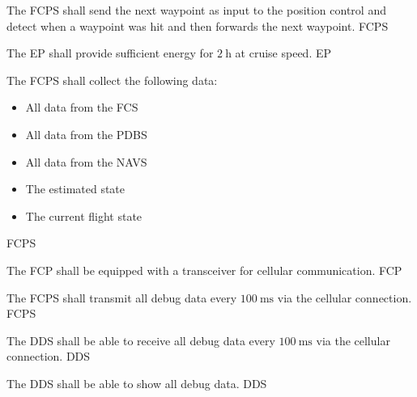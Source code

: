 {
			The FCPS shall send the next waypoint as input to the position control and detect when a waypoint was hit 
			and then forwards the next waypoint.
		}
{  }
{FCPS}

{
			The EP shall provide sufficient energy for $\SI{2}{\hour}$ at cruise speed.
		}
{  }
{EP}

{
			The FCPS shall collect the following data: 
			\begin{itemize} 
				\item All data from the FCS 
				\item All data from the PDBS 
				\item All data from the NAVS 
				\item The estimated state 
				\item The current flight state 
			\end{itemize}
		}
{  }
{FCPS}

{
			The FCP shall be equipped with a transceiver for cellular communication.
		}
{  }
{FCP}

{
			The FCPS shall transmit all debug data  every $\SI{100}{\milli \second}$ via the cellular connection.
		}
{  }
{FCPS}

{
			The DDS shall be able to receive all debug data every 
			$\SI{100}{\milli \second}$ via the cellular connection.
		}
{  }
{DDS}

{
			The DDS shall be able to show all debug data.
		}
{  }
{DDS}

